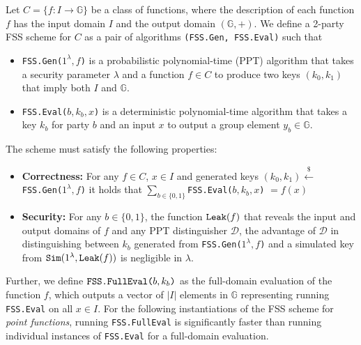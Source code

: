 \begin{definition}
\label{def:FSS}
    Let $C = \{f: I \rightarrow \mathbb{G}\}$ be a class of functions, where the description of each function $f$ has the input domain $I$ and the output domain $(\mathbb{G}, +)$. We define a 2-party FSS scheme for $C$ as a pair of algorithms \texttt{\textup{(FSS.Gen, FSS.Eval)}} such that
    \begin{itemize}
        \item \texttt{\textup{FSS.Gen($1^\lambda, f$)}} is a probabilistic polynomial-time (PPT) algorithm that takes a security parameter $\lambda$ and a function $f \in C$ to produce two keys $(k_0, k_1)$ that imply both $I$ and $\mathbb{G}$.
        \item \texttt{\textup{FSS.Eval($b, k_b, x$)}} is a deterministic polynomial-time algorithm that takes a key $k_b$ for party $b$ and an input $x$ to output a group element $y_b \in \mathbb{G}$.
    \end{itemize}
    The scheme must satisfy the following properties:
    \begin{itemize}
        \item \textbf{\textup{\textbf{Correctness:}}} For any $f \in C$, $x \in I$ and generated keys $(k_0, k_1) \stackrel{\$}{\leftarrow}$ \texttt{\textup{FSS.Gen($1^\lambda, f$)}} it holds that $\sum_{b\in\{0,1\}}$\texttt{\textup{FSS.Eval($b, k_b, x$)}} $= f(x)$
        
        \item \textbf{\textup{\textbf{Security:}}} For any $b \in \{0,1\}$, the function $\texttt{\textup{Leak}}(f)$ that reveals the input and output domains of $f$ and any PPT distinguisher $\mathcal{D}$, the advantage of $\mathcal{D}$ in distinguishing between $k_b$ generated from \texttt{\textup{FSS.Gen($1^\lambda, f$)}} and a simulated key from $\texttt{\textup{Sim}}(1^\lambda, \texttt{\textup{Leak}}(f))$ is negligible in $\lambda$.
    \end{itemize}
\end{definition}

Further, we define $\texttt{\textup{FSS.FullEval($b, k_b$)}}$ as the full-domain evaluation of the function $f$, which outputs a vector of $|I|$ elements in $\mathbb{G}$ representing running \texttt{\textup{FSS.Eval}} on all $x \in I$. For the following instantiations of the FSS scheme for \textit{point functions}, running \texttt{\textup{FSS.FullEval}} is significantly faster than running individual instances of \texttt{\textup{FSS.Eval}} for a full-domain evaluation.

